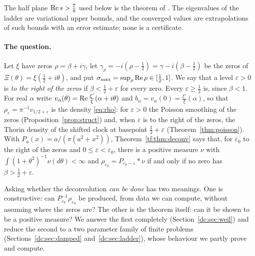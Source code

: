 \label{chap:dc}

The half plane $\operatorname{Re} s>\frac78$ used below is the theorem of \cite{OAI26a}. The eigenvalues of the ladder are variational upper bounds, and the converged values are extrapolations of such bounds with an error estimate; none is a certificate.

\paragraph{The question.}\label{dc:sec:question} Let $\xi$ have zeros $\rho=\beta+i\gamma$, let $\gamma_\rho=-i(\rho-\frac12)=\gamma-i(\beta-\frac12)$ be the zeros of $\Xi(\theta)=\xi(\frac12+i\theta)$, and put $\sigma_{\max}=\sup_\rho\operatorname{Re}\rho\in[\frac12,1]$. We say that a level $\varepsilon>0$ is \emph{to the right of the zeros} if $\beta<\frac12+\varepsilon$ for every zero. Every $\varepsilon\ge\frac12$ is, since $\beta<1$. For real $\alpha$ write $v_\alpha(\theta)=\operatorname{Re}\frac{\xi'}{\xi}(\alpha+i\theta)$ and $b_\alpha=v_\alpha(0)=\frac{\xi'}{\xi}(\alpha)$, so that $\rho_\varepsilon=\pi^{-1}v_{1/2+\varepsilon}$ is the density \eqref{eq:rho}: for $\varepsilon>0$ the Poisson smoothing of the zeros (Proposition~\ref{prop:struct}) and, when $\varepsilon$ is to the right of the zeros, the Thorin density of the shifted clock at basepoint $\frac12+\varepsilon$ (Theorem~\ref{thm:poisson}). With $P_a(x)=a/(\pi(a^2+x^2))$, Theorem~\ref{tf:thm:deconv} says that, for $\varepsilon_0$ to the right of the zeros and $0\le\varepsilon<\varepsilon_0$, there is a positive measure $\nu$ with $\int(1+\theta^2)^{-1}\nu(d\theta)<\infty$ and $\rho_{\varepsilon_0}=P_{\varepsilon_0-\varepsilon}*\nu$ if and only if no zero has $\beta>\frac12+\varepsilon$.

Asking whether the deconvolution \emph{can be done} has two meanings. One is constructive: can $P_{\varepsilon_0}^{-1}\rho_{\varepsilon_0}$ be produced, from data we can compute, without assuming where the zeros are? The other is the theorem itself: can it be shown to be a positive measure? We answer the first completely (Section~\ref{dc:sec:weil}) and reduce the second to a two parameter family of finite problems (Sections~\ref{dc:sec:damped} and~\ref{dc:sec:ladder}), whose behaviour we partly prove and compute.
